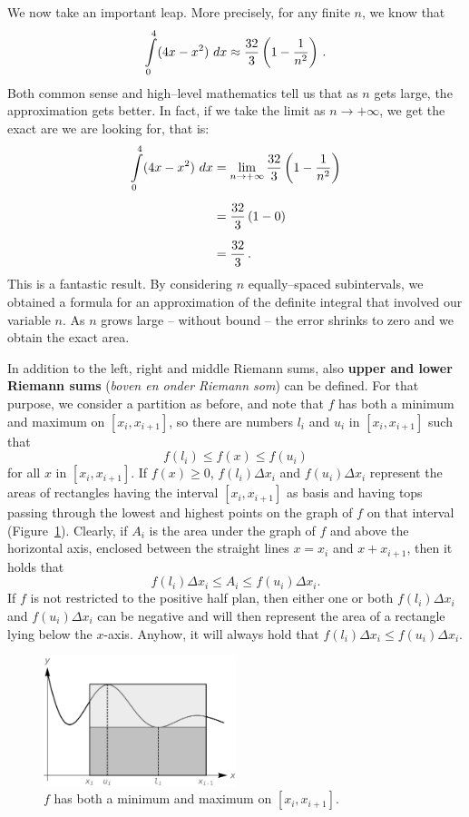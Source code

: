 \begin{example}
We now take an important leap. More precisely, for any finite $n$, we know that 
$$\ds\int\limits_0^4 (4x-x^2)\ dx \approx \frac{32}{3}\left(1-\frac{1}{n^2}\right)\,.$$ 
Both common sense and high--level mathematics tell us that as $n$ gets large, the approximation gets better. In fact, if we take the limit as $n\rightarrow +\infty$, we get the exact are we are looking for, that is: 
\allowdisplaybreaks
\begin{align*}
\displaystyle\int\limits_0^4 (4x-x^2)\ dx &= \lim_{n\rightarrow +\infty} \frac{32}{3}\left(1-\frac{1}{n^2}\right) \\[0.2cm]
									&= \frac{32}{3}\left(1-0\right)\\[0.2cm]
									&= \frac{32}{3}\,.
\end{align*}
This is a fantastic result. By considering $n$ equally--spaced subintervals, we obtained a formula for an approximation of the definite integral that involved our variable $n$. As $n$ grows large -- without bound -- the error shrinks to zero and we obtain the exact area.
\end{example}

In addition to the left, right and middle Riemann sums, also \textbf{upper and lower Riemann sums} (\textit{boven en onder Riemann som}) can be defined. For that purpose, we consider a partition as before, and note that $f$ has both a minimum and maximum on $[x_i,x_{i+1}]$, so there are numbers $l_i$ and $u_i$ in $[x_i,x_{i+1}]$ such that
$$
f(l_i)\leq f(x)\leq f(u_i)
$$
for all $x$ in $[x_i,x_{i+1}]$. If $f(x)\geq0$, $f(l_i)\Delta x_i$ and $f(u_i)\Delta x_i$ represent the areas of rectangles having the interval $[x_i,x_{i+1}]$ as basis and having tops passing through the lowest and highest points on the graph of $f$ on that interval (Figure~\ref{fig_int_6}). Clearly, if $A_i$ is the area under the graph of $f$ and above the horizontal axis, enclosed between the straight lines $x=x_i$ and $x+x_{i+1}$, then it holds that 
$$
f(l_i)\Delta x_i\leq A_i\leq f(u_i)\Delta x_i.
$$
If $f$ is not restricted to the positive half plan, then either one or both $f(l_i)\Delta x_i$ and $f(u_i)\Delta x_i$ can be negative and will then represent the area of a rectangle lying below the $x$-axis. Anyhow, it will always hold that $f(l_i)\Delta x_i\leq f(u_i)\Delta x_i$.

\begin{figure}
	\begin{center}
			\includegraphics[width=0.5\textwidth]{fig_int_6}
	\caption{$f$ has both a minimum and maximum on $[x_i,x_{i+1}]$.}
	\label{fig_int_6}
	\end{center}
\end{figure}

